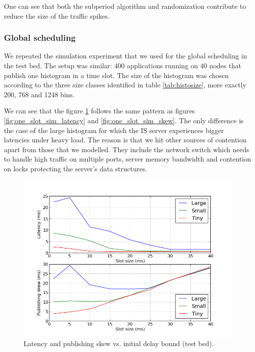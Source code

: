 One can see that both the subperiod algorithm and randomization contribute to reduce the size of the traffic spikes. 

\subsubsection*{Global scheduling}

We repeated the simulation experiment that we used for the global scheduling in the test bed. The setup was similar: 400 applications running on 40 nodes that publish one histogram in a time slot. The size of the histogram was chosen according to the three size classes identified in table \ref{tab:histosize}, more exactly 200, 768 and 1248 bins. 

We can see that the figure \ref{fig:one_slot_tbed} follows the same pattern as figures \ref{fig:one_slot_sim_latency} and \ref{fig:one_slot_sim_skew}. The only difference is the case of the large histogram for which the IS server experiences bigger latencies under heavy load. The reason is that we hit other sources of contention apart from those that we modelled. They include the network switch which needs to handle high traffic on multiple ports, server memory bandwidth and contention on locks protecting the server's data structures.

\begin{figure}[ht]
\centering
\includegraphics[scale=0.6]{Images/one_slot_tbed.png}
\caption{Latency and publishing skew vs. initial delay bound (test bed).}
\label{fig:one_slot_tbed}
\end{figure}

